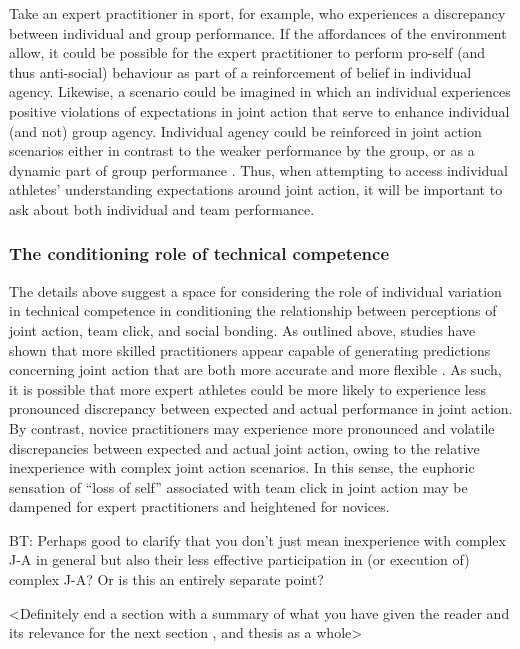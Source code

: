 Take an expert practitioner in sport, for example, who experiences a discrepancy between individual and group performance. If the affordances of the environment allow, it could be possible for the expert practitioner to perform pro-self (and thus anti-social) behaviour as part of a reinforcement of belief in individual agency.  Likewise, a scenario could be imagined in which an individual experiences positive violations of expectations in joint action that serve to enhance individual (and not) group agency.  Individual agency could be reinforced in joint action scenarios either in contrast to the weaker performance by the group, or as a dynamic part of group performance \citep[in a similar sense to the theory of identity fusion, outlined above][]{Swann2009,Swann2015}. Thus, when attempting to access individual athletes' understanding expectations around joint action, it will be important to ask about both individual and team performance.


\subsubsection{The conditioning role of technical competence}
The details above suggest a space for considering the role of individual variation in technical competence in conditioning the relationship between perceptions of joint action, team click, and social bonding.  As outlined above, studies have shown that more skilled practitioners appear capable of generating predictions concerning joint action that are both more accurate and more flexible \citep{Schmidt2011,Tomeo2012,Caron2017}.  As such, it is possible that more expert athletes could be more likely to experience less pronounced discrepancy between expected and actual performance in joint action. By contrast, novice practitioners may experience more pronounced and volatile discrepancies between expected and actual joint action, owing to the relative inexperience with complex joint action scenarios.  In this sense, the euphoric sensation of ``loss of self'' associated with team click in joint action may be dampened for expert practitioners and heightened for novices.

BT: Perhaps good to clarify that you don’t just mean inexperience with complex J-A in general but also their less effective participation in (or execution of) complex J-A? Or is this an entirely separate point?

<Definitely end a section with a summary of what you have given the reader and its relevance for the next section , and thesis as a whole>


